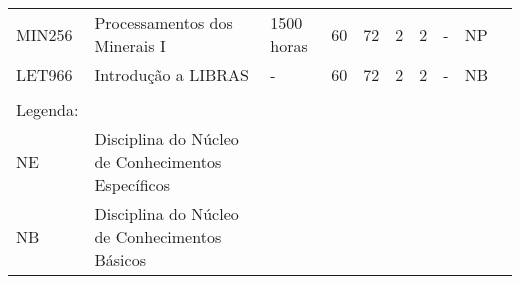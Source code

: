 \begin{table}[tbp]
{\begin{tabular}{llllllllll}
			\multicolumn{1}{|l|}{MIN256}                    & \multicolumn{1}{l|}{Processamentos dos Minerais I}                                        & \multicolumn{1}{l|}{1500 horas}             & \multicolumn{1}{l|}{60}                                                           & \multicolumn{1}{l|}{72}               & \multicolumn{1}{l|}{2}  & \multicolumn{1}{l|}{2}  & \multicolumn{1}{l|}{-}                & \multicolumn{1}{l|}{NP}            &  \\ \cline{1-9}
			\multicolumn{1}{|l|}{LET966}                    & \multicolumn{1}{l|}{Introdução a LIBRAS}                                                  & \multicolumn{1}{l|}{-}                      & \multicolumn{1}{l|}{60}                                                           & \multicolumn{1}{l|}{72}               & \multicolumn{1}{l|}{2}  & \multicolumn{1}{l|}{2}  & \multicolumn{1}{l|}{-}                & \multicolumn{1}{l|}{NB}            &  \\ \cline{1-9}
			&                                                                                           &                                             &                                                                                   &                                       &                         &                         &                                       &                                    &  \\ \cline{1-2}
			\multicolumn{1}{|l|}{Legenda:}                  & \multicolumn{1}{l|}{}                                                                     &                                             &                                                                                   &                                       &                         &                         &                                       &                                    &  \\ \cline{1-2}
			\multicolumn{1}{|l|}{NE}                        & \multicolumn{1}{l|}{Disciplina do Núcleo de Conhecimentos Específicos}                    &                                             &                                                                                   &                                       &                         &                         &                                       &                                    &  \\ \cline{1-2}
			\multicolumn{1}{|l|}{{\color[HTML]{333333} NB}} & \multicolumn{1}{l|}{{\color[HTML]{333333} Disciplina do Núcleo de Conhecimentos Básicos}} & {\color[HTML]{009901} }                     & {\color[HTML]{009901} }                                                           & {\color[HTML]{009901} }               & {\color[HTML]{009901} } & {\color[HTML]{009901} } & {\color[HTML]{009901} }               & {\color[HTML]{009901} }            &  \\ \cline{1-2}

\end{tabular}}
\end{table}
